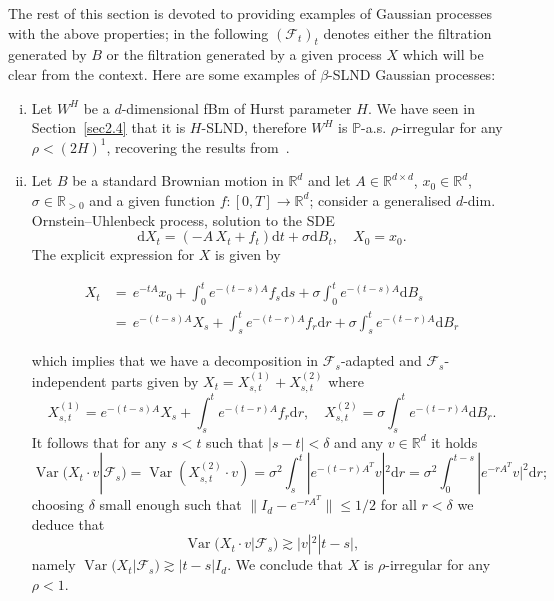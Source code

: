 \documentclass[10pt]{article}
\newcommand{\mathd}{\mathrm{d}}
\newcommand{\nobracket}{}
\newcommand{\tmop}[1]{\ensuremath{\operatorname{#1}}}
\newenvironment{enumerateroman}{\begin{enumerate}[i.] }{\end{enumerate}}
\begin{document}
The rest of this section is devoted to providing examples of Gaussian
processes with the above properties; in the following $(\mathcal{F}_t)_t$
denotes either the filtration generated by $B$ or the filtration generated by
a given process $X$ which will be clear from the context. Here are some
examples of $\beta$\mbox{-}SLND Gaussian processes:
  \begin{enumerateroman}
    \item Let $W^H$ be a $d$-dimensional fBm of Hurst parameter $H$. We have
    seen in Section~\ref{sec2.4} that it is $H$\mbox{-}SLND, therefore $W^H$
    is $\mathbb{P}$-a.s. $\rho$\mbox{-}irregular for any $\rho < (2 H)^1$,
    recovering the results from~{\cite{catelliergubinelli}}.
    
    \item Let $B$ be a standard Brownian motion in $\mathbb{R}^d$ and let $A
    \in \mathbb{R}^{d \times d}$, $x_0 \in \mathbb{R}^d$, $\sigma \in
    \mathbb{R}_{> 0}$ and a given function $f : [0, T] \rightarrow
    \mathbb{R}^d$; consider a generalised $d$-dim. Ornstein--Uhlenbeck
    process, solution to the SDE
    \[ \mathd X_t = \left( - A \, X_t + f_t \right) \mathd t + \sigma \mathd
       B_t, \quad X_0 = x_0 . \]
    The explicit expression for $X$ is given by
    
    \begin{align*}
      X_t & = \, e^{- t A} x_0 + \int_0^t e^{- (t - s) A} f_s \mathd s +
      \sigma \int_0^t e^{- (t - s) A} \mathd B_s\\
      & = \, e^{- (t - s) A} X_s + \int_s^t e^{- (t - r) A} f_r \mathd r +
      \sigma \int_s^t e^{- (t - r) A} \mathd B_r
    \end{align*}
    
    which implies that we have a decomposition in $\mathcal{F}_s$-adapted and
    $\mathcal{F}_s$-independent parts given by $X_t = X_{s, t}^{(1)} + X_{s,
    t}^{(2)}$ where
    \[ X^{(1)}_{s, t} = e^{- (t - s) A} X_s + \int_s^t e^{- (t - r) A} f_r
       \mathd r, \quad X_{s, t}^{(2)} = \sigma \int_s^t e^{- (t - r) A} \mathd
       B_r . \]
    It follows that for any $s < t$ such that $| s - t | < \delta$ and any $v
    \in \mathbb{R}^d$ it holds
    \[ \tmop{Var} (X_t \cdot v | \mathcal{F}_s \nobracket) = \tmop{Var}
       (X^{(2)}_{s, t} \cdot v) = \sigma^2 \int_s^t | e^{- (t - r) A^T} v |^2
       \mathd r = \sigma^2 \int_0^{t - s} | e^{- r A^T} v |^2 \mathd r ; \]
    choosing $\delta$ small enough such that $\| I_d - e^{- r A^T} \|
    \leqslant 1 / 2$ for all $r < \delta$ we deduce that
    \[ \tmop{Var} (X_t \cdot v | \mathcal{F}_s \nobracket) \gtrsim | v |^2  |
       t - s |, \]
    namely $\tmop{Var} (X_t | \mathcal{F}_s \nobracket) \gtrsim | t - s |
    I_d$. We conclude that $X$ is $\rho$-irregular for any $\rho < 1$.
    

\end{enumerateroman}
\end{document}
